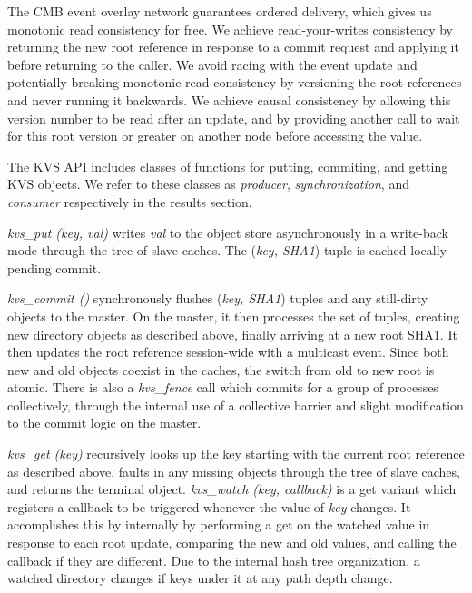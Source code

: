 The CMB event overlay network guarantees ordered delivery, which gives
us monotonic read consistency for free.  We achieve read-your-writes
consistency by returning the new root reference in response to a commit
request and applying it before returning to the caller.  We avoid
racing with the event update and potentially breaking monotonic read
consistency by versioning the root references and never running it
backwards.  We achieve causal consistency by allowing this version number
to be read after an update, and by providing another call to wait for this
root version or greater on another node before accessing the value.

The KVS API includes classes of functions for putting, commiting, and
getting KVS objects.  We refer to these classes as
{\em producer}, {\em synchronization}, and {\em consumer} respectively
in the results section.

{\em kvs\_put (key, val)}
writes {\em val} to the object store asynchronously in a write-back
mode through the tree of slave caches.
The ({\em key, SHA1}) tuple is cached locally pending commit.

{\em kvs\_commit ()} synchronously flushes ({\em key, SHA1}) tuples
and any still-dirty objects to the master.  On the master, it then
processes the set of tuples, creating new directory objects as described
above, finally arriving at a new root SHA1.  It then updates the 
root reference session-wide with a multicast event.
Since both new and old objects coexist in the caches, the switch from old
to new root is atomic.
There is also a {\em kvs\_fence} call which commits for a group of
processes collectively, through the internal use of a collective barrier
and slight modification to the commit logic on the master.

{\em kvs\_get (key)} recursively looks up the key starting with the
current root reference as described above, faults in any missing objects
through the tree of slave caches, and returns the terminal object.
{\em kvs\_watch (key, callback)} is a get variant which registers a
callback to be triggered whenever the value of {\em key} changes.
It accomplishes this by internally by performing a get on the watched
value in response to each root update, comparing the new
and old values, and calling the callback if they are different.
Due to the internal hash tree organization, a watched directory changes
if keys under it at any path depth change.

